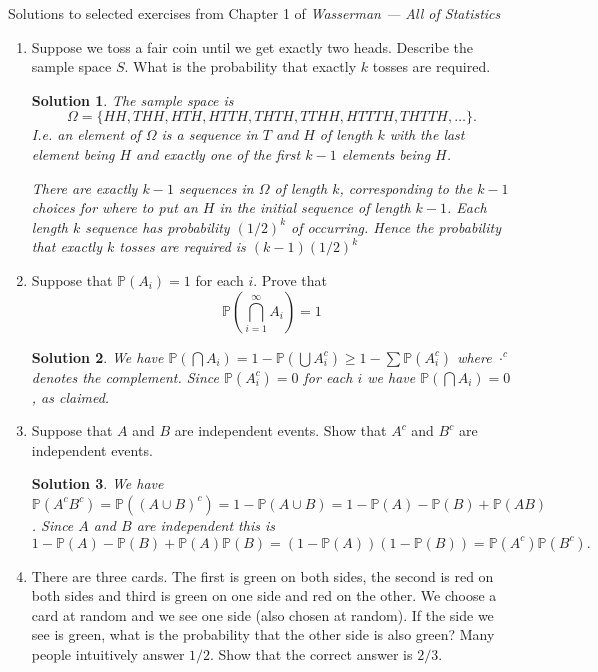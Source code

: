 \documentclass[10pt]{article}
\newtheorem*{sol}{Solution}
\renewcommand{\P}{\mathbb{P}}
\begin{document}
\noindent \large{Solutions to selected exercises from Chapter 1 of
\emph{Wasserman --- All of Statistics}}

\begin{enumerate}
\item[(5)] Suppose we toss a fair coin until we get exactly two heads.
Describe the sample space $S$. What is the probability that exactly
$k$ tosses are required.

\begin{sol}
The sample space is
\[\Omega = \{HH, THH, HTH, HTTH, THTH, TTHH, HTTTH, THTTH, \ldots\}.\]
I.e. an element of $\Omega$ is a sequence in $T$ and $H$
of length $k$ with the last element
being $H$ and exactly one of the first $k-1$ elements being $H$.

There are exactly $k-1$ sequences in $\Omega$ of length $k$, corresponding
to the $k-1$ choices for where to put an $H$ in the initial sequence of
length $k-1$. Each length $k$ sequence has probability $(1/2)^k$ of occurring.
Hence the probability that exactly $k$ tosses are required is $(k-1)(1/2)^k$
\end{sol}

\item[(8)] Suppose that $\P(A_i)=1$ for each $i$. Prove that
\[
\P\left(\bigcap_{i=1}^\infty A_i\right) = 1
\]

\begin{sol}
We have $\P(\bigcap A_i) = 1 -\P(\bigcup A_i^c) \geq 1 - \sum \P(A_i^c)$
where $\cdot^c$ denotes the complement. Since $\P(A_i^c)=0$ for each $i$
we have $\P(\bigcap A_i)=0$, as claimed.
\end{sol}

\item[(11)] Suppose that $A$ and $B$ are independent events. Show that $A^c$
and $B^c$ are independent events.

\begin{sol}
We have $\P(A^cB^c)=\P((A\cup B)^c)=1-\P(A\cup B)=1-\P(A)-\P(B)+\P(AB)$.
Since $A$ and $B$ are independent this is
\[
1-\P(A)-\P(B)+\P(A)\P(B)=(1-\P(A))(1-\P(B)) = \P(A^c)\P(B^c).
\]
\end{sol}

\item[(12)] There are three cards. The first is green on both sides, the
second is red on both sides and third is green on one side and red on the
other. We choose a card at random and we see one side (also chosen at
random). If the side we see is green, what is the probability that the
other side is also green? Many people intuitively answer $1/2$. Show that
the correct answer is $2/3$.


\end{enumerate}
\end{document}
